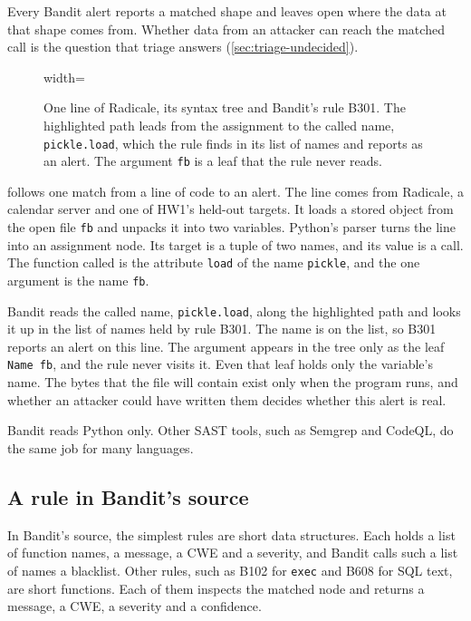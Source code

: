 Every Bandit alert reports a matched shape and leaves open where the data at that shape comes from.
Whether data from an attacker can reach the matched call is the question that triage answers
(\cref{sec:triage-undecided}).

\begin{figure}[t]
  \centering
  \begin{adjustbox}{width=\textwidth}\end{adjustbox}
  \caption{One line of Radicale, its syntax tree and Bandit's rule B301. The highlighted path leads
  from the assignment to the called name, \texttt{pickle.load}, which the rule finds in its list of
  names and reports as an alert. The argument \texttt{fb} is a leaf that the rule never reads.}
  \label{fig:triage-tree}
\end{figure}

 follows one match from a line of code to an alert. The line comes from
Radicale, a calendar server and one of HW1's held-out targets. It loads a stored object from the
open file \texttt{fb} and unpacks it into two variables. Python's parser turns the line into an
assignment node. Its target is a tuple of two names, and its value is a call. The function called is
the attribute \texttt{load} of the name \texttt{pickle}, and the one argument is the name
\texttt{fb}.

Bandit reads the called name, \texttt{pickle.load}, along the highlighted path and looks it up in
the list of names held by rule B301. The name is on the list, so B301 reports an alert on this line.
The argument appears in the tree only as the leaf \texttt{Name fb}, and the rule never visits it.
Even that leaf holds only the variable's name. The bytes that the file will contain exist only when
the program runs, and whether an attacker could have written them decides whether this alert is
real.

Bandit reads Python only. Other SAST tools, such as Semgrep and CodeQL, do the same job for many
languages.

\subsection{A rule in Bandit's source}
\label{sec:triage-rule}

In Bandit's source, the simplest rules are short data structures. Each holds a list of function
names, a message, a CWE and a severity, and Bandit calls such a list of names a blacklist. Other
rules, such as B102 for \texttt{exec} and B608 for SQL text, are short functions. Each of them
inspects the matched node and returns a message, a CWE, a severity and a confidence.

